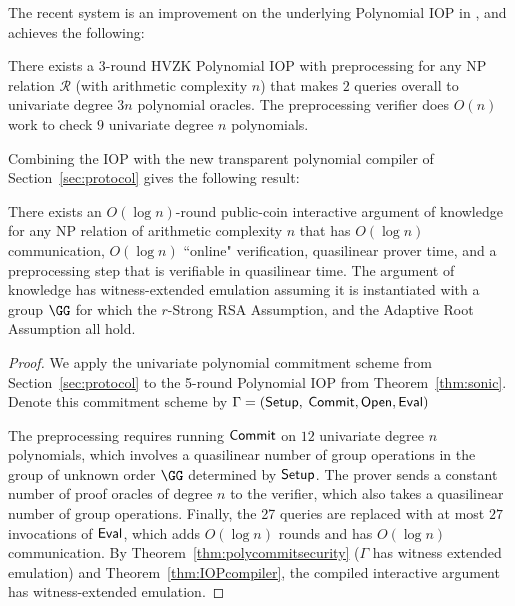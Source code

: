 The recent system  is an improvement on the underlying Polynomial IOP in , and achieves the following: 

\begin{theorem} 
There exists a 3-round HVZK Polynomial IOP with preprocessing for any NP relation $\mathcal{R}$ (with arithmetic complexity $n$) that makes $2$ queries overall to univariate degree $3n$ polynomial oracles. The preprocessing verifier does $O(n)$ work to check $9$ univariate degree $n$ polynomials.
\end{theorem}

Combining the  IOP with the new transparent polynomial compiler of Section~\ref{sec:protocol} gives the following result:  

\begin{theorem}
There exists an $O(\log n)$-round public-coin interactive argument of knowledge for any NP relation of arithmetic complexity $n$ that has $O(\log n)$ communication, $O(\log n)$ ``online" verification, quasilinear prover time, and a preprocessing step that is verifiable in quasilinear time. The argument of knowledge has witness-extended emulation assuming it is instantiated with a group $\GG$ for which the $r$-Strong RSA Assumption, and the Adaptive Root Assumption all hold. 
\end{theorem}
\begin{proof}
We apply the univariate polynomial commitment scheme from Section~\ref{sec:protocol} to the 5-round Polynomial IOP from Theorem~\ref{thm:sonic}. Denote this commitment scheme by $\Gamma = (\textsf{{Setup}},$ $\textsf{{Commit}}, \textsf{{Open}}, \textsf{{Eval}})$ 

The preprocessing requires running $\textsf{{Commit}}$ on $12$ univariate degree $n$ polynomials, which involves a quasilinear number of group operations in the group of unknown order $\GG$ determined by $\textsf{{Setup}}$. The prover sends a constant number of proof oracles of degree $n$ to the verifier, which also takes a quasilinear number of group operations. Finally, the 27 queries are replaced with at most $27$ invocations of $\textsf{{Eval}}$, which adds $O(\log n )$ rounds and has $O(\log n)$ communication. By Theorem~\ref{thm:polycommitsecurity} ($\Gamma$ has witness extended emulation) and Theorem~\ref{thm:IOPcompiler}, the compiled interactive argument has witness-extended emulation.
\end{proof}




